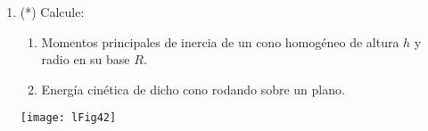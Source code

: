 \documentclass[11pt,spanish,a4paper]{article}
\begin{document}
\begin{enumerate}
\item 
\begin{minipage}[t][3.5cm]{0.5\textwidth}
(*) Calcule:
	\begin{enumerate}
		\item Momentos principales de inercia de un cono homogéneo de altura \(h\) y radio en su base \(R\).
		\item Energía cinética de dicho cono rodando sobre un plano.
	\end{enumerate}
\end{minipage}
\begin{minipage}[c][1cm][t]{0.45\textwidth}
	\texttt{[image: lFig42]}
\end{minipage}




\end{enumerate}
\end{document}
